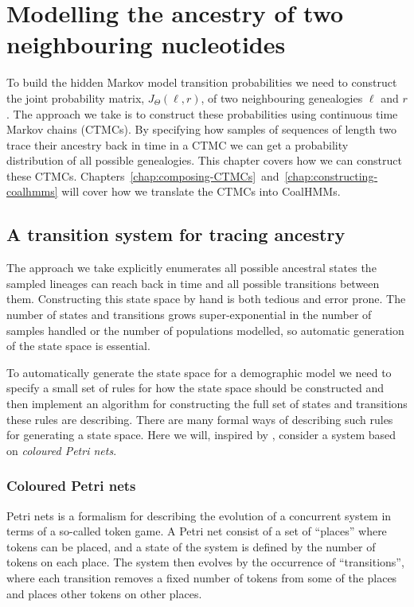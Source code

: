 \chapter{Modelling the ancestry of two neighbouring nucleotides}
\label{chap:modelling-2-ARGs}

To build the hidden Markov model transition probabilities we need to construct the joint probability matrix, $J_\Theta(\ell,r)$, of two neighbouring genealogies $\ell$ and $r$. The approach we take is to construct these probabilities using continuous time Markov chains (CTMCs). By specifying how samples of sequences of length two trace their ancestry back in time in a CTMC we can get a probability distribution of all possible genealogies. This chapter covers how we can construct these CTMCs. Chapters~\ref{chap:composing-CTMCs}~and~\ref{chap:constructing-coalhmms} will cover how we translate the CTMCs into CoalHMMs.

\section{A transition system for tracing ancestry}

The approach we take explicitly enumerates all possible ancestral states the sampled lineages can reach back in time and all possible transitions between them. Constructing this state space by hand is both tedious and error prone. The number of states and transitions grows super-exponential in the number of samples handled or the number of populations modelled, so automatic generation of the state space is essential.

To automatically generate the state space for a demographic model we need to specify a small set of rules for how the state space should be constructed and then implement an algorithm for constructing the full set of states and transitions these rules are describing. There are many formal ways of describing such rules for generating a state space. Here we will, inspired by \citet{springerlink:10.1007/978-3-642-31131-4_3}, consider a system based on \emph{coloured Petri nets}.

\subsection{Coloured Petri nets}

Petri nets is a formalism for describing the evolution of a concurrent system in terms of a so-called token game. A Petri net consist of a set of ``places'' where tokens can be placed, and a state of the system is defined by the number of tokens on each place. The system then evolves by the occurrence of ``transitions'', where each transition removes a fixed number of tokens from some of the places and places other tokens on other places.


